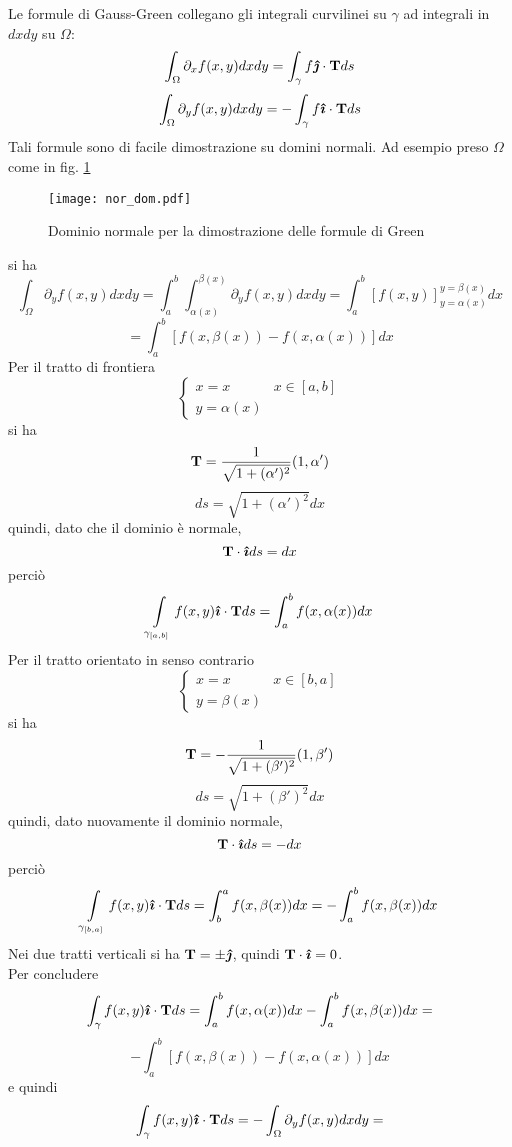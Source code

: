 Le formule di Gauss-Green collegano gli integrali curvilinei su $\gamma$
ad integrali in $dx dy$ su $\Omega$:
\[
	\int_{\Omega}\partial_x f(x,y)dx dy= \int_{\gamma} f \boldsymbol{\hat{\jmath}} \cdot {\bf T} ds
\]
\[
	\int_{\Omega}\partial_y f(x,y)dx dy= - \int_{\gamma} f \boldsymbol{\hat{\imath}} \cdot {\bf T} ds
\]
Tali formule sono di facile dimostrazione su domini normali. Ad esempio
preso $\Omega$ come in fig. \ref{nor_dom}
\begin{figure}[H]
	\centering
	\texttt{[image: nor\_dom.pdf]}
	\caption{Dominio normale per la dimostrazione delle formule di Green}
	\label{nor_dom}
\end{figure}
\noindent
si ha
\[
	\int_{\Omega} \partial_y f (x,y) dx dy=
	\int_a^b \int_{\alpha(x)}^{\beta(x)}
	\partial_y f (x,y) dx dy=
	\int_a^b \left[
		f(x,y)
	\right]_{y=\alpha(x)}^{y=\beta(x)}dx
\]
\[
	= \int_a^b \left[
	f(x,\beta (x)) - f(x, \alpha(x))
	\right] dx
\]
Per il tratto di frontiera
\[
	\left\{ 
	\begin{array}{ll}
		x=x & x \in [a,b] \\
		y= \alpha(x)
	\end{array}
	\right.
\]
si ha
\[
	{\bf T}= \frac{1}{\sqrt{1+ (\alpha ' )^2}}(1,\alpha ')
\]
\[
	ds= \sqrt{1+ (\alpha ' )^2} dx
\]
quindi, dato che il dominio \`e normale,
\[
	{\bf T} \cdot \boldsymbol{\hat{\imath}} ds= dx
\]
perci\`o
\[
	\int \limits_{\gamma_{[a,b]}} f(x,y)\boldsymbol{\hat{\imath}} \cdot {\bf T} ds
	= \int_a^b f(x, \alpha(x)) dx
\]
Per il tratto orientato in senso contrario
\[
	\left\{ 
	\begin{array}{ll}
		x=x & x \in [b,a] \\
		y= \beta(x)
	\end{array}
	\right.
\]
si ha
\[
	{\bf T}= - \frac{1}{\sqrt{1+ (\beta ' )^2}}(1,\beta ')
\]
\[
	ds= \sqrt{1+ (\beta ' )^2} dx
\]
quindi, dato nuovamente il dominio normale,
\[
	{\bf T} \cdot \boldsymbol{\hat{\imath}} ds= -dx
\]
perci\`o
\[
	\int \limits_{\gamma_{[b,a]}} f(x,y)\boldsymbol{\hat{\imath}} \cdot {\bf T} ds
	= \int_b^a f(x, \beta(x)) dx
	= -\int_a^b f(x, \beta(x)) dx
\]
Nei due tratti verticali si ha ${\bf T} = \pm \boldsymbol{\hat{\jmath}}$, 
quindi ${\bf T} \cdot \boldsymbol{\hat{\imath}} = 0$.\\
Per concludere
\[
	\int_{\gamma} f(x,y)\boldsymbol{\hat{\imath}} \cdot {\bf T} ds = 
	\int_a^b f(x, \alpha(x)) dx
	- \int_a^b f(x, \beta(x)) dx=
\]
\[
	- \int_a^b \left[ f(x, \beta(x)) -f(x, \alpha(x)) \right] dx
\]
e quindi
\[
	\int_{\gamma} f(x,y)\boldsymbol{\hat{\imath}} \cdot {\bf T} ds =
	- \int_{\Omega} \partial_y f (x,y) dx dy=
\]
